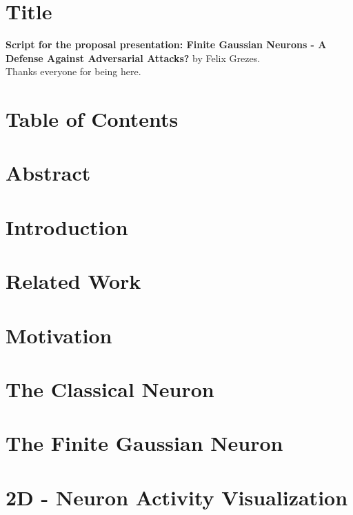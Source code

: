 \documentclass{article}
\begin{document}

\section{Title}
\textbf{Script for the proposal presentation: Finite Gaussian Neurons - A Defense Against Adversarial Attacks?} by Felix Grezes.\\

Thanks everyone for being here.

\section{Table of Contents}

\section{Abstract}

\section{Introduction}

\section{Related Work}

\section{Motivation}

\section{The Classical Neuron}

\section{The Finite Gaussian Neuron}

\section{2D - Neuron Activity Visualization}
\end{document}
